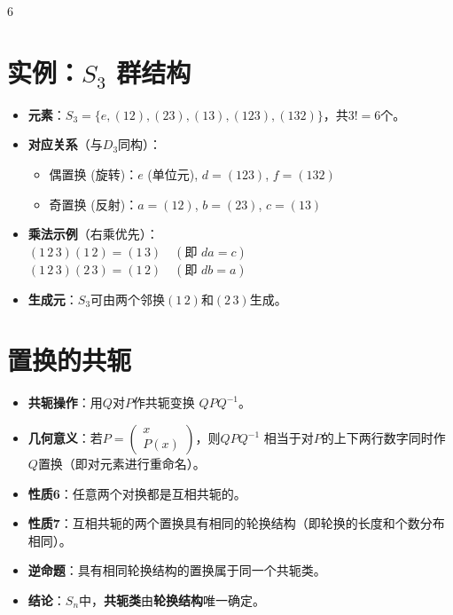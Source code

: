 \documentclass[landscape]{article}
\begin{document}
\begin{multicols*}{6}
\section*{实例：$S_3$ 群结构}
\begin{itemize}
  \item \textbf{元素}：$S_3 = \{e, (12), (23), (13), (123), (132)\}$，共$3!=6$个。
  \item \textbf{对应关系}（与$D_3$同构）：
  \begin{itemize}
      \item 偶置换 (旋转)：$e$ (单位元), $d=(123)$, $f=(132)$
      \item 奇置换 (反射)：$a=(12)$, $b=(23)$, $c=(13)$
  \end{itemize}
  \item \textbf{乘法示例}（右乘优先）：
  \\ $ (1\,2\,3)(1\,2) = (1\,3) \quad (\text{即 } da=c) $
  \\ $ (1\,2\,3)(2\,3) = (1\,2) \quad (\text{即 } db=a) $
  \item \textbf{生成元}：$S_3$可由两个邻换$(1\,2)$和$(2\,3)$生成。
\end{itemize}
\section*{置换的共轭}
\begin{itemize}
  \item \textbf{共轭操作}：用$Q$对$P$作共轭变换 $QPQ^{-1}$。
  \item \textbf{几何意义}：若$P=\begin{pmatrix} x \\ P(x) \end{pmatrix}$，则$QPQ^{-1}$ 相当于对$P$的上下两行数字同时作$Q$置换（即对元素进行重命名）。
  \item \textbf{性质6}：{\color{red}任意两个对换都是互相共轭的}。
  \item \textbf{性质7}：{\color{red}互相共轭的两个置换具有相同的轮换结构}（即轮换的长度和个数分布相同）。
  \item \textbf{逆命题}：具有相同轮换结构的置换属于同一个共轭类。
  \item \textbf{结论}：$S_n$中，\textbf{共轭类}由\textbf{轮换结构}唯一确定。
\end{itemize}


\end{multicols*}
\end{document}
